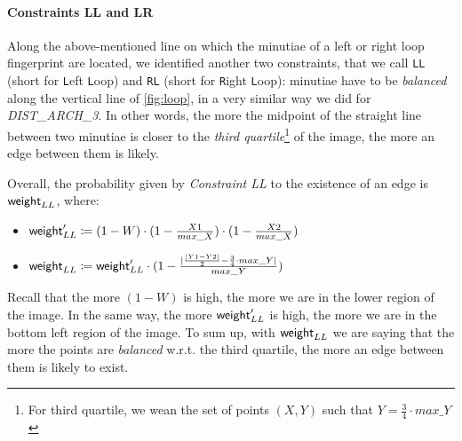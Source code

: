 \documentclass[8pt]{article}
\begin{document}
\paragraph{Constraints LL and LR}
Along the above-mentioned line on which the minutiae of a left or right loop
fingerprint are located, we identified another two constraints, that we call
\texttt{LL} (short for \texttt{L}eft \texttt{L}oop) and \texttt{RL} (short for
\texttt{R}ight \texttt{L}oop): minutiae have to be \emph{balanced} along the
vertical line of \cref{fig:loop}, in a very similar way we did for
\emph{DIST\_ARCH\_3}. In other words, the more the midpoint of the straight
 line between
two minutiae is closer to the \emph{third quartile}\footnote{For third
quartile, we wean the set of points $(X,Y)$ such that $Y=\frac{3}{4}\cdot
max\_Y$} of the image, the more an edge between them is likely.

Overall, the probability given by \emph{Constraint LL} to the existence of an
edge is $\textsf{weight}_{LL}$, where:
  \begin{itemize}
    \item
      $\textsf{weight}_{LL}^\prime \coloneqq 
        (1-W) \cdot (1-\frac{X1}{max\_X}) \cdot (1-\frac{X2}{max\_X})$ 
    \item
      $\textsf{weight}_{LL} \coloneqq
        \textsf{weight}_{LL}^\prime \cdot (1-
        \frac{\lvert \frac{\lvert Y1-Y2 \rvert}{2} - \frac{3}{4}\cdot max\_Y
        \rvert}{max\_Y})$
  \end{itemize}
Recall that the more $(1-W)$ is high, the more we are in the lower region of
the image. In the same way, the more $\textsf{weight}_{LL}^\prime$ is high, the more we
are in the bottom left region of the image.  To sum up, with $\textsf{weight}_{LL}$ we
are saying that the more the points are \emph{balanced} w.r.t. the third
quartile, the more an edge between them is likely to exist.
\end{document}
